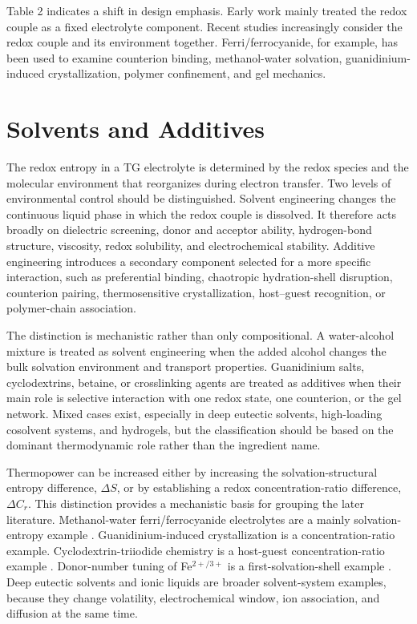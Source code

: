 Table 2 indicates a shift in design emphasis. Early work mainly treated the
redox couple as a fixed electrolyte component. Recent studies increasingly
consider the redox couple and its environment together. Ferri/ferrocyanide, for
example, has been used to examine counterion binding, methanol-water solvation,
guanidinium-induced crystallization, polymer confinement, and gel mechanics.

\section{Solvents and Additives}

The redox entropy in a TG electrolyte is determined by the redox species and
the molecular environment that reorganizes during electron transfer. Two levels
of environmental control should be distinguished. Solvent engineering changes
the continuous liquid phase in which the redox couple is dissolved. It therefore
acts broadly on dielectric screening, donor and acceptor ability,
hydrogen-bond structure, viscosity, redox solubility, and electrochemical
stability. Additive engineering introduces a secondary component selected for a
more specific interaction, such as preferential binding, chaotropic
hydration-shell disruption, counterion pairing, thermosensitive crystallization,
host--guest recognition, or polymer-chain association.

The distinction is mechanistic rather than only compositional. A water-alcohol
mixture is treated as solvent engineering when the added alcohol changes the
bulk solvation environment and transport properties. Guanidinium salts,
cyclodextrins, betaine, or crosslinking agents are treated as additives when
their main role is selective interaction with one redox state, one counterion,
or the gel network. Mixed cases exist, especially in deep eutectic solvents,
high-loading cosolvent systems, and hydrogels, but the classification should be
based on the dominant thermodynamic role rather than the ingredient name.

Thermopower can be increased either by increasing the solvation-structural
entropy difference, $\Delta S$, or by establishing a redox concentration-ratio
difference, $\Delta C_r$. This distinction provides a
mechanistic basis for grouping the later literature. Methanol-water ferri/ferrocyanide electrolytes
are a mainly solvation-entropy example \citep{kim2017high}. Guanidinium-induced crystallization is
a concentration-ratio example. Cyclodextrin-triiodide chemistry is a
host-guest concentration-ratio example \citep{yu2020thermosensitive,
zhou2016supramolecular}. Donor-number tuning of Fe$^{2+/3+}$ is
a first-solvation-shell example \citep{chen2023solvation}. Deep eutectic solvents and ionic liquids are
broader solvent-system examples, because they change volatility,
electrochemical window, ion association, and diffusion at the same time.

